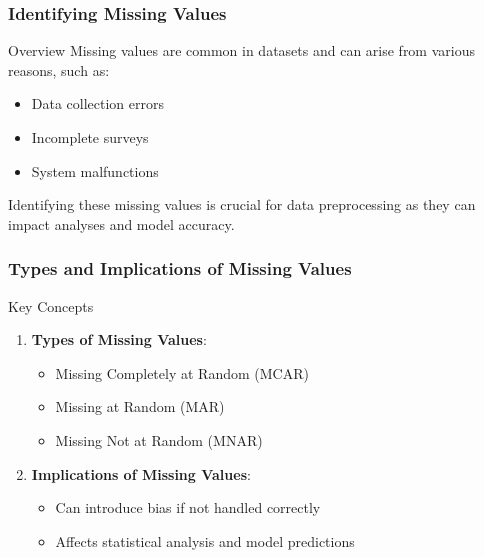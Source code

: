 \documentclass[aspectratio=169]{beamer}
\begin{document}
\begin{frame}[fragile]
  \frametitle{Identifying Missing Values}
  \begin{block}{Overview}
    Missing values are common in datasets and can arise from various reasons, such as:
    \begin{itemize}
      \item Data collection errors
      \item Incomplete surveys
      \item System malfunctions
    \end{itemize}
    Identifying these missing values is crucial for data preprocessing as they can impact analyses and model accuracy.
  \end{block}
\end{frame}

\begin{frame}[fragile]
  \frametitle{Types and Implications of Missing Values}
  \begin{block}{Key Concepts}
    \begin{enumerate}
      \item \textbf{Types of Missing Values}:
        \begin{itemize}
          \item Missing Completely at Random (MCAR)
          \item Missing at Random (MAR)
          \item Missing Not at Random (MNAR)
        \end{itemize}
      \item \textbf{Implications of Missing Values}:
        \begin{itemize}
          \item Can introduce bias if not handled correctly
          \item Affects statistical analysis and model predictions
        \end{itemize}
    \end{enumerate}
  \end{block}
\end{frame}
\end{document}
